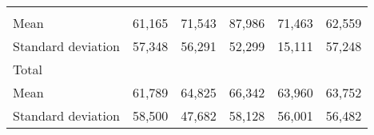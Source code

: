 \begin{tabular}{llllll}
  \multicolumn{1}{|r}{} &
  \multicolumn{1}{r}{} &
  \multicolumn{1}{r}{} &
  \multicolumn{1}{r}{} &
  \multicolumn{1}{r}{} \\
\multicolumn{1}{l}{\hspace{4em}Mean} &
  \multicolumn{1}{|r}{61,165} &
  \multicolumn{1}{r}{71,543} &
  \multicolumn{1}{r}{87,986} &
  \multicolumn{1}{r}{71,463} &
  \multicolumn{1}{r}{62,559} \\
\multicolumn{1}{l}{\hspace{4em}Standard deviation} &
  \multicolumn{1}{|r}{57,348} &
  \multicolumn{1}{r}{56,291} &
  \multicolumn{1}{r}{52,299} &
  \multicolumn{1}{r}{15,111} &
  \multicolumn{1}{r}{57,248} \\
\multicolumn{1}{l}{\hspace{3em}Total} &
  \multicolumn{1}{|r}{} &
  \multicolumn{1}{r}{} &
  \multicolumn{1}{r}{} &
  \multicolumn{1}{r}{} &
  \multicolumn{1}{r}{} \\
\multicolumn{1}{l}{\hspace{4em}Mean} &
  \multicolumn{1}{|r}{61,789} &
  \multicolumn{1}{r}{64,825} &
  \multicolumn{1}{r}{66,342} &
  \multicolumn{1}{r}{63,960} &
  \multicolumn{1}{r}{63,752} \\
\multicolumn{1}{l}{\hspace{4em}Standard deviation} &
  \multicolumn{1}{|r}{58,500} &
  \multicolumn{1}{r}{47,682} &
  \multicolumn{1}{r}{58,128} &
  \multicolumn{1}{r}{56,001} &
  \multicolumn{1}{r}{56,482} \\
\cline{1-6}
\end{tabular}

